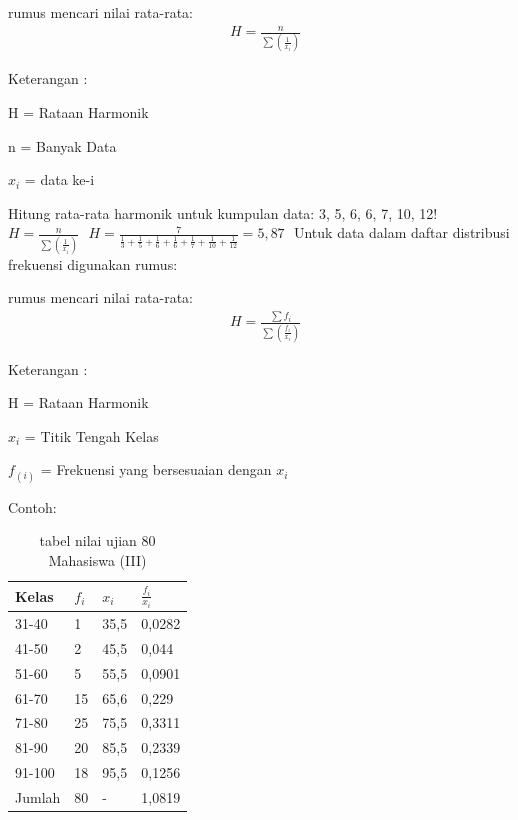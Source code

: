 \documentclass[11pt,fleqn]{book} %
\begin{document}
{\begin{theorem}[Mean]
rumus mencari nilai rata-rata:
\begin{align}
& H = \frac{n}{\sum (\frac{1}{x_{i}})} 
\end{align}
\end{theorem}

Keterangan :

H = Rataan Harmonik 

n = Banyak Data

$ x_{i} $ = data ke-i

Hitung rata-rata harmonik untuk kumpulan data: 3, 5, 6, 6, 7, 10, 12!
$ $
$ H = \frac{n}{\sum (\frac{1}{x_{i}})} $
$ $
$H = \frac{7}{\frac{1}{3}+\frac{1}{5}+\frac{1}{6}+\frac{1}{6}+\frac{1}{7}+\frac{1}{10}+\frac{1}{12}} = 5,87$
$ $
Untuk data dalam daftar distribusi frekuensi digunakan rumus:


\begin{theorem}[Mean]
rumus mencari nilai rata-rata:
\begin{align}
& H = \frac{\sum f_{i}}{\sum (\frac{f_{i}}{x_{i}})}
\end{align}
\end{theorem}

Keterangan :	

H = Rataan Harmonik

$ x_{i} $ = Titik Tengah Kelas

$ f_(i) $ = Frekuensi yang bersesuaian dengan $x_{i}$

Contoh: 

\begin{table}[h]
\centering
\begin{tabular}{l l l l}
\toprule
\textbf{Kelas} & \textbf{$f_{i}$} & \textbf{$x_{i}$} & \textbf{$\frac{f_{i}}{x_{i}}$}\\
\midrule
31-40 & 1 & 35,5 & 0,0282 \\
41-50 & 2 & 45,5 & 0,044 \\
51-60 & 5 & 55,5 & 0,0901\\
61-70 & 15 & 65,6 & 0,229\\
71-80 & 25 & 75,5 & 0,3311\\
81-90 & 20 & 85,5 & 0,2339\\
91-100 & 18 & 95,5 & 0,1256\\
Jumlah & 80 & - & 1,0819 \\
\bottomrule
\end{tabular}
\caption{tabel nilai ujian 80 Mahasiswa (III)}
\end{table}

}
\end{document}
